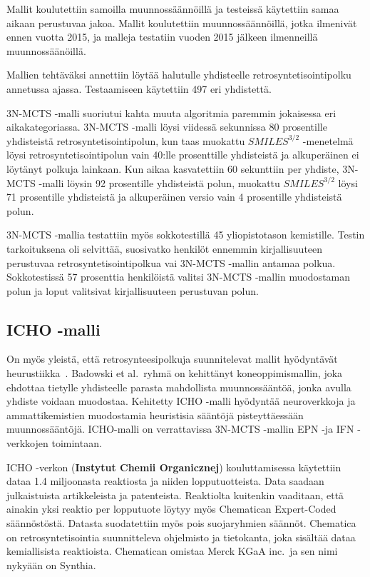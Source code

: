 \documentclass[finnish,twoside,censored,tkt,sw-line]{HYthesisML}
\begin{document}
Mallit koulutettiin samoilla muunnossäännöillä ja testeissä käytettiin samaa aikaan perustuvaa jakoa.
Mallit koulutettiin muunnossäännöillä, jotka ilmenivät ennen vuotta 2015, ja malleja testatiin vuoden 2015 jälkeen ilmenneillä muunnossäänöillä.

Mallien tehtäväksi annettiin löytää halutulle yhdisteelle retrosyntetisointipolku annetussa ajassa.
Testaamiseen käytettiin 497 eri yhdistettä.

3N-MCTS -malli suoriutui kahta muuta algoritmia paremmin jokaisessa eri aikakategoriassa.
3N-MCTS -malli löysi viidessä sekunnissa 80 prosentille yhdisteistä retrosyntetisointipolun, kun taas muokattu \(SMILES^{3/2}\) -menetelmä löysi retrosyntetisointipolun vain 40:lle prosenttille yhdisteistä ja alkuperäinen ei löytänyt polkuja lainkaan.
Kun aikaa kasvatettiin 60 sekunttiin per yhdiste, 3N-MCTS -malli löysin 92 prosentille yhdisteistä polun, muokattu \(SMILES^{3/2}\) löysi 71 prosentille yhdisteistä ja alkuperäinen versio vain 4 prosentille yhdisteistä polun.

3N-MCTS -mallia testattiin myös sokkotestillä 45 yliopistotason kemistille.
Testin tarkoituksena oli selvittää, suosivatko henkilöt ennemmin kirjallisuuteen perustuvaa retrosyntetisointipolkua vai 3N-MCTS -mallin antamaa polkua.
Sokkotestissä 57 prosenttia henkilöistä valitsi 3N-MCTS -mallin muodostaman polun ja loput valitsivat kirjallisuuteen perustuvan polun.

\subsection{ICHO -malli}

On myös yleistä, että retrosynteesipolkuja suunnitelevat mallit hyödyntävät heurustiikka~\cite{ExpertKnowledgeRetorsynthesis}.
Badowski et al.\ ryhmä on kehittänyt koneoppimismallin, joka ehdottaa tietylle yhdisteelle parasta mahdollista muunnossääntöä, jonka avulla yhdiste voidaan muodostaa.
Kehitetty ICHO -malli hyödyntää  neuroverkkoja ja ammattikemistien muodostamia heuristisia sääntöjä pisteyttäessään muunnossääntöjä.
ICHO-malli on verrattavissa 3N-MCTS -mallin EPN -ja IFN -verkkojen toimintaan.

ICHO -verkon (\textbf{Instytut Chemii Organicznej}) kouluttamisessa käytettiin dataa 1.4 miljoonasta reaktiosta ja niiden lopputuotteista.
Data saadaan julkaistuista artikkeleista ja patenteista.
Reaktiolta kuitenkin vaaditaan, että ainakin yksi reaktio per lopputuote löytyy myös Chematican Expert-Coded säännöstöstä.
Datasta suodatettiin myös pois suojaryhmien säännöt.
Chematica on retrosyntetisointia suunnitteleva ohjelmisto ja tietokanta, joka sisältää dataa kemiallisista reaktioista.
Chematican omistaa Merck KGaA inc.\ ja sen nimi nykyään on Synthia.
\end{document}
